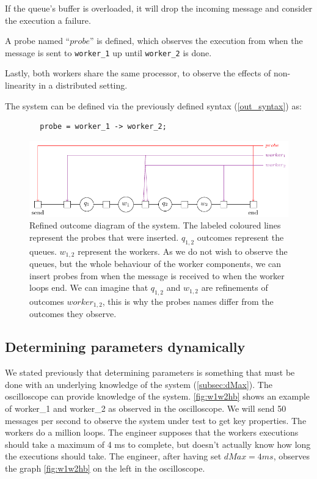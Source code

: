     If the queue's buffer is overloaded, it will drop the incoming message and consider the execution a failure.
    
    A probe named ``$probe$'' is defined, which observes the execution from when the message is sent to \texttt{worker\_1} up until \texttt{worker\_2} is done.

    Lastly, both workers share the same processor, to observe the effects of non-linearity in a distributed setting.

    The system can be defined via the previously defined syntax (\cref{out_syntax}) as: 
    
    \begin{verbatim}
        probe = worker_1 -> worker_2;
    \end{verbatim}

    \begin{figure}[H]
        \begin{center}
            \includegraphics[scale=1]{tikz/mm1k.pdf} 
        \end{center}
        \caption{Refined outcome diagram of the system. The labeled coloured lines represent the probes that were inserted. $q_{1, 2}$ outcomes represent the queues. $w_{1,2}$ represent the workers. As we do not wish to observe the queues, but the whole behaviour of the worker components, we can insert probes from when the message is received to when the worker loops end. We can imagine that $q_{1,2}$ and $w_{1,2}$ are refinements of outcomes $worker_{1,2}$, this is why the probes names differ from the outcomes they observe.}
        \label{fig:mm1k}
    \end{figure}

    \subsection{Determining parameters dynamically}
        We stated previously that determining parameters is something that must be done with an underlying knowledge of the system (\cref{subsec:dMax}). The oscilloscope can provide knowledge of the system. \cref{fig:w1w2hb} shows an example of worker\_1 and worker\_2 as observed in the oscilloscope.
We will send 50 messages per second to observe the system under test to get key
properties. The workers do a million loops.
        The engineer supposes that the workers executions should take a maximum of 4 ms to complete, but doesn't actually know how long the executions should take. The engineer, after having set $dMax = 4ms$, observes the graph \cref{fig:w1w2hb} on the left in the oscilloscope.

